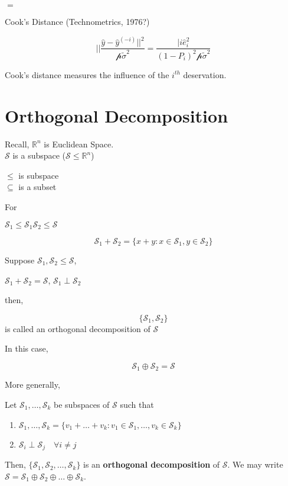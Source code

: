 \documentclass[11pt,fleqn]{book} %
\begin{document}
$= $


Cook's Distance (Technometrics, 1976?)

$$||\frac {\hat{y} - \hat{y}^{(-i)} ||^2}{\mathscr{p} \tilde{\sigma}^2} = \frac{|i \hat{e}_i^2}{(1 - P_i)^2 \mathscr{p} \tilde{\sigma}^2} $$

\begin{definition} Cook's distance measures the influence of the $i^{th}$ deservation.
\end{definition}

\section{Orthogonal Decomposition}

Recall,
$\mathbb{R}^n$ is Euclidean Space.\\

$\mathscr{S}$ is a subspace ($\mathscr{S} \leq \mathbb{R}^n$)

\begin{remark}
	$\leq$ is subspace\\
	$\subseteq$ is a subset
\end{remark}

For 

$\mathscr{S}_1 \leq \mathscr{S}_1 \mathscr{S}_2 \leq \mathscr{S}$

$$\mathscr{S}_1 + \mathscr{S}_2 = \{x + y: x \in \mathscr{S}_1, y \in \mathscr{S}_2 \} $$


Suppose $\mathscr{S}_1, \mathscr{S}_2 \leq \mathscr{S}$, 

$\mathscr{S}_1 + \mathscr{S}_2 = \mathscr{S}$, $\mathscr{S}_1 \perp \mathscr{S}_2$

then, 

	$$\{\mathscr{S}_1, \mathscr{S}_2 \} $$ is called an orthogonal decomposition of $\mathscr{S}$


In this case, 

	$$\mathscr{S}_1 \oplus \mathscr{S}_2 = \mathscr{S} $$

More generally, 

\begin{definition}
	Let $\mathscr{S}_1, \dots, \mathscr{S}_k$ be subspaces of $\mathscr{S}$ such that

	\begin{enumerate}
		\item $\mathscr{S}_1, \dots, \mathscr{S}_k = \{v_1 + \dots + v_k : v_1 \in \mathscr{S}_1, \dots, v_k \in \mathscr{S}_k\}$
		\item $\mathscr{S}_i \perp \mathscr{S}_j \quad \forall i\neq j$
	\end{enumerate}
	
	Then, $\{\mathscr{S}_1, \mathscr{S}_2, \dots, \mathscr{S}_k\}$ is an \textbf{orthogonal decomposition} of $\mathscr{S}$. We may write $\mathscr{S} = \mathscr{S}_1 \oplus \mathscr{S}_2 \oplus \dots \oplus \mathscr{S}_k$.
\end{definition}
\end{document}
